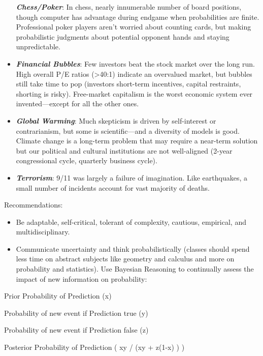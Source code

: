 \documentclass[
]{article}
\begin{document}
\begin{itemize}
  \textbf{\emph{Chess/Poker}}: In chess, nearly innumerable number of
  board positions, though computer has advantage during endgame when
  probabilities are finite. Professional poker players aren't worried
  about counting cards, but making probabilistic judgments about
  potential opponent hands and staying unpredictable.
\item
  \textbf{\emph{Financial Bubbles}}: Few investors beat the stock market
  over the long run. High overall P/E ratios (\textgreater40:1) indicate
  an overvalued market, but bubbles still take time to pop (investors
  short-term incentives, capital restraints, shorting is risky).
  Free-market capitalism is the worst economic system ever
  invented---except for all the other ones.
\item
  \textbf{\emph{Global Warming}}: Much skepticism is driven by
  self-interest or contrarianism, but some is scientific---and a
  diversity of models is good. Climate change is a long-term problem
  that may require a near-term solution but our political and cultural
  institutions are not well-aligned (2-year congressional cycle,
  quarterly business cycle).
\item
  \textbf{\emph{Terrorism}}: 9/11 was largely a failure of imagination.
  Like earthquakes, a small number of incidents account for vast
  majority of deaths.
\end{itemize}

Recommendations:

\begin{itemize}
\item
  Be adaptable, self-critical, tolerant of complexity, cautious,
  empirical, and multidisciplinary.
\item
  Communicate uncertainty and think probabilistically (classes should
  spend less time on abstract subjects like geometry and calculus and
  more on probability and statistics). Use Bayesian Reasoning to
  continually assess the impact of new information on probability:
\end{itemize}

Prior Probability of Prediction (x)

Probability of new event if Prediction true (y)

Probability of new event if Prediction false (z)

Posterior Probability of Prediction ( xy / (xy + z(1-x) ) )
\end{document}
